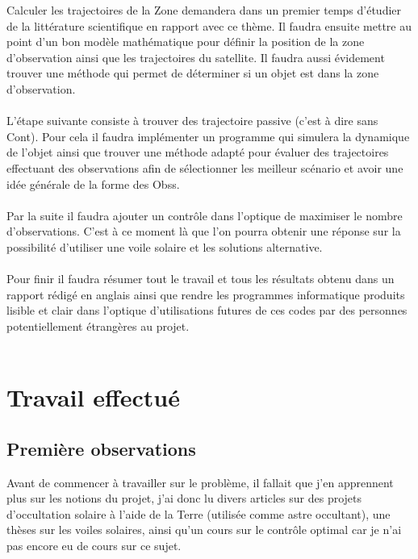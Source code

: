 \documentclass[12pt]{article} %
\begin{document}
		Calculer les trajectoires de la \gls{Zone} demandera dans un premier temps d'étudier de la littérature scientifique en rapport avec ce thème. Il faudra ensuite mettre au point d'un bon modèle mathématique pour définir la position de la zone d'observation ainsi que les trajectoires du satellite. Il faudra aussi évidement trouver une méthode qui permet de déterminer si un objet est dans la zone d'observation.
		\\ \\
		L'étape suivante consiste à trouver des trajectoire passive (c'est à dire sans \gls{Cont}). Pour cela il faudra implémenter un programme qui simulera la dynamique de l'objet ainsi que trouver une méthode adapté pour évaluer des trajectoires effectuant des observations afin de sélectionner les meilleur scénario et avoir une idée générale de la forme des \glspl{Obs}.
		\\ \\
		Par la suite il faudra ajouter un contrôle dans l'optique de maximiser le nombre d'observations. C'est à ce moment là que l'on pourra obtenir une réponse sur la possibilité d'utiliser une voile solaire et les solutions alternative.
		\\ \\
		Pour finir il faudra résumer tout le travail et tous les résultats obtenu dans un rapport rédigé en anglais ainsi que rendre les programmes informatique produits lisible et clair dans l'optique d'utilisations futures de ces codes par des personnes potentiellement étrangères au projet.
		\\ \\
		
		\newpage
		\section{Travail effectué}
		
		\subsection{Première observations}
		Avant de commencer à travailler sur le problème, il fallait que j'en apprennent plus sur les notions du projet, j'ai donc lu divers articles sur des projets d'occultation solaire à l'aide de la Terre (utilisée comme astre occultant), une thèses sur les voiles solaires, ainsi qu'un cours sur le contrôle optimal car je n'ai pas encore eu de cours sur ce sujet.
		
\end{document}
